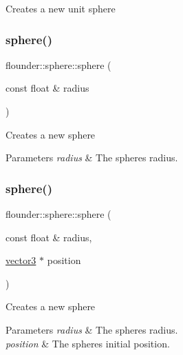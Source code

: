 Creates a new unit sphere 

\mbox{\label{classflounder_1_1sphere_ad6598fc632cabc8a516cef89f1f0cae9}} 
\subsubsection{\texorpdfstring{sphere()}{sphere()}\hspace{0.1cm}{\footnotesize\ttfamily [2/4]}}
{\footnotesize\ttfamily flounder\+::sphere\+::sphere (\begin{DoxyParamCaption}\item[{const float \&}]{radius }\end{DoxyParamCaption})}



Creates a new sphere 


\begin{DoxyParams}{Parameters}
{\em radius} & The spheres radius. \\
\hline
\end{DoxyParams}
\mbox{\label{classflounder_1_1sphere_a760cbc4b1b1dc51e47813b4c0d0b489d}} 
\subsubsection{\texorpdfstring{sphere()}{sphere()}\hspace{0.1cm}{\footnotesize\ttfamily [3/4]}}
{\footnotesize\ttfamily flounder\+::sphere\+::sphere (\begin{DoxyParamCaption}\item[{const float \&}]{radius,  }\item[{\hyperlink{classflounder_1_1vector3}{vector3} $\ast$}]{position }\end{DoxyParamCaption})}



Creates a new sphere 


\begin{DoxyParams}{Parameters}
{\em radius} & The spheres radius. \\
\hline
{\em position} & The spheres initial position. \\
\hline
\end{DoxyParams}
\mbox{\label{classflounder_1_1sphere_a9457d57b8555428bd6abeb4bb6fd6dcb}} 
